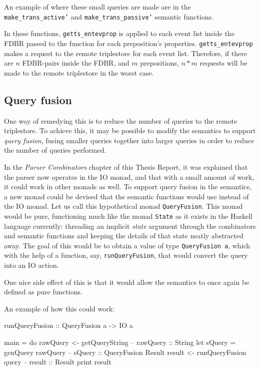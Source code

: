 \documentclass[../main.tex]{subfiles}
\begin{document}
An example of where these small queries are made are in the \texttt{make\_trans\_active'} and \texttt{make\_trans\_passive'} semantic functions.

In these functions, \texttt{getts\_entevprop} is applied to each event list inside the FDBR passed to the function for each preposition's properties.  \texttt{getts\_entevprop} makes a request to the remote triplestore for each event list.  Therefore, if there are $n$ FDBR-pairs inside the FDBR, and
$m$ prepositions, $n*m$ requests will be made to the remote triplestore in the worst case.

\subsection{Query fusion}

One way of remedying this is to reduce the number of queries to the remote triplestore.  To achieve this, it may be possible to modify the semantics to
support {\em query fusion}, fusing smaller queries together into larger queries in order to reduce the number of queries performed.

In the {\em Parser Combinators} chapter of this Thesis Report, it was explained that the parser now operates in the IO monad, and that with a small amount of work, it could
work in other monads as well.  To support query fusion in the semantics, a new monad could be devised that the semantic functions would use instead of the IO monad.  Let us
call this hypothetical monad \texttt{QueryFusion}.  This monad would be pure, functioning much like the monad \texttt{State} as it exists in the Haskell language currently: threading an implicit {\em state} argument through the combinators and semantic functions and keeping the details of that state neatly abstracted away.  The goal of this would be to obtain a value of type \texttt{QueryFusion a}, which with the help of a function, say, \texttt{runQueryFusion}, that would convert the query into an IO action.

One nice side effect of this is that it would allow the semantics to once again be defined as pure functions.

An example of how this could work:

\begin{code}
	
runQueryFusion :: QueryFusion a -> IO a

main = do
  rawQuery <- getQueryString      -- rawQuery :: String
  let sQuery = genQuery rawQuery  -- sQuery   :: QueryFusion Result
  result <- runQueryFusion query  -- result   :: Result
  print result

\end{code}
\end{document}
